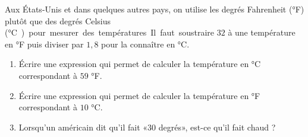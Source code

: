 
\begin{exercice}\label{exosmath-0734}

Aux États-Unis et dans quelques autres pays, on utilise les degrés Fahrenheit (°F) plutôt que des degrés Celsius (\si\degreeCelsius) pour mesurer des températures. Il faut soustraire $32$ à une température en °F puis diviser par $1,8$ pour la connaître en °C.  

\begin{enumerate}
    \item
Écrire une expression qui permet de calculer la température en °C correspondant à $59$ °F.
\item
Écrire une expression qui permet de calculer la température en °F correspondant à $10$ °C.
\item
    Lorsqu'un américain dit qu'il fait «\( 30\) degrés», est-ce qu'il fait chaud ?
\end{enumerate}

\end{exercice}
